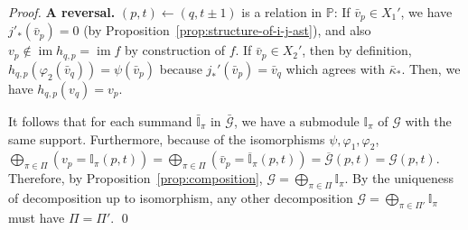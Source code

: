 \documentclass[10pt,a4paper]{amsart}
\newcommand{\im}{\operatorname{im}}
\renewcommand{\phi}{\varphi}
\begin{document}
\begin{proof}
    \textbf{A reversal.} $(p,t)\leftarrow (q,t\pm 1)$ is a relation in $\mathbb P$: 
        If $\bar v_p\in X_1'$, we have $j'_\ast(\bar v_p)=0$ (by Proposition~\ref{prop:structure-of-i-j-ast}), 
            and also $v_p\not\in\im h_{q,p}=\im f$ by construction of $f$. 
    If $\bar v_p\in X_2'$, then by definition,
        $h_{q,p}(\phi_2(\bar v_q))=\psi(\bar v_p)$ because $j_\ast'(\bar v_p)=\bar v_q$ which agrees with $\bar{\kappa}_\ast$.
        Then, we have $h_{q,p}(v_q)=v_p$.
        

    It follows that for each summand $\bar{\mathbb{I}}_\pi$ in $\bar{\mathcal G}$, we have a submodule $\mathbb{I}_\pi$ of $\mathcal G$ with the same support. Furthermore, because of the isomorphisms $\psi,\phi_1,\phi_2$,
    $\bigoplus_{\pi\in \Pi} (v_p=\mathbb I_\pi(p,t))=\bigoplus_{\pi\in \Pi}(\bar v_p= \overline{\mathbb{I}}_\pi(p,t))=\overline{\mathcal G}(p,t)=\mathcal{G}(p,t)$.
    Therefore, by Proposition~\ref{prop:composition}, $\mathcal G=\bigoplus_{\pi\in \Pi} \mathbb I_\pi$. By the uniqueness of decomposition up to isomorphism,
    any other decomposition $\mathcal G=\bigoplus_{\pi\in \Pi'}\mathbb I_\pi$ must have
    $\Pi=\Pi'$. \qed
\end{proof}
\end{document}
